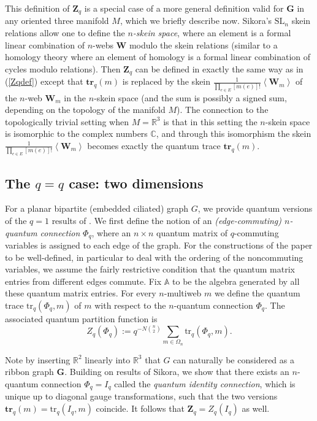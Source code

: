 \documentclass[12pt, reqno]{amsart}
\theoremstyle{definition}
\newcommand{\Zqc}{Z_q}%
\newcommand{\Zq}{\mathbf{Z}_q}%
\newcommand{\R}{\mathbb{R}}%
\newcommand{\trqc}{\mathrm{tr}_q}%
\newcommand{\trq}{\mathbf{tr}_q}%
\newcommand{\SL}{\mathrm{SL}}%
\begin{document}
This definition of $\Zq$ is a special case of a more general definition valid for $\mathbf{G}$ in any oriented three manifold $M$, which we briefly describe now.    Sikora's $\SL_n$ skein relations allow one to define the \emph{$n$-skein space}, where an element is a formal linear combination of $n$-webs $\mathbf{W}$ modulo   the skein relations (similar to a homology theory where an element of homology is a formal linear combination of cycles modulo relations).    Then $\Zq$ can be defined in exactly the same way as in (\ref{Zqdef}) except that $\trq(m)$ is replaced by the skein   $\frac{1}{\prod_{e\in E}[m(e)]!} \left<\mathbf{W}_m\right>$ of the $n$-web $\mathbf{W}_m$ in the $n$-skein space   (and the sum is possibly a signed sum, depending on the topology of the manifold $M$).  The connection to the topologically trivial setting when $M=\R^3$ is that in   this setting the $n$-skein space is isomorphic to the complex numbers $\mathbb{C}$, and through this isomorphism the   skein $\frac{1}{\prod_{e\in E}[m(e)]!} \left<\mathbf{W}_m\right>$ becomes exactly the quantum trace $\trq(m)$.
  
\subsection{The \texorpdfstring{$q=q$}{q=q} case:  two dimensions}

For a planar bipartite (embedded ciliated) graph $G$, we provide quantum versions of the $q=1$ results of \cite{DKS, KenyonOvenhouse}.  We first define the notion of an \emph{(edge-commuting) $n$-quantum connection} $\Phi_q$, where an $n\times n$ quantum matrix of $q$-commuting variables is assigned to each edge of the graph.  For the constructions of the paper to be well-defined, in particular to deal with the ordering of the noncommuting variables, we assume the fairly restrictive condition that the quantum matrix entries from different edges commute.  Fix $\mathbb{A}$ to be the algebra generated by all these quantum matrix entries.  For every $n$-multiweb $m$ we define the quantum trace $\trqc(\Phi_q,m)$ of $m$ with respect to the $n$-quantum connection $\Phi_q$.  The associated quantum partition function is 
$$
\Zqc(\Phi_q):=q^{-N\binom{n}{2}}\sum_{m\in\Omega_n}\trqc(\Phi_q,m).
$$

Note by inserting $\R^2$ linearly into $\R^3$ that $G$ can naturally be considered as a ribbon graph $\mathbf{G}$.  Building on results of Sikora, we show that there exists an $n$-quantum connection $\Phi_q=I_q$ called the \emph{quantum identity connection}, which is unique up to diagonal gauge transformations, such that the two versions $\trq(m)=\trqc(I_q,m)$ coincide.  It follows that $\Zq=\Zqc(I_q)$ as well.  
\end{document}
